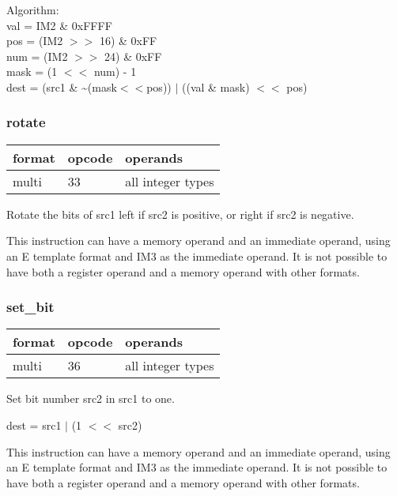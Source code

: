 \documentclass[forwardcom.tex]{subfiles}
\begin{document}
Algorithm:\\
val = IM2 \& 0xFFFF\\
pos = (IM2 $>>$ 16) \& 0xFF\\
num = (IM2 $>>$ 24) \& 0xFF\\
mask = (1 $<<$ num) - 1\\

dest = (src1 \& \~{}(mask$<<$pos)) $|$ ((val \& mask) $<<$ pos)
\vspace{2mm}


\subsubsection{rotate}
\label{table:rotateInstruction}
\begin{tabular}{|p{12mm}|p{12mm}|p{110mm}|}
\hline
\bfseries format & \bfseries opcode & \bfseries operands \\ \hline
multi & 33 & all integer types \\ \hline
\end{tabular}
\vspace{2mm}

Rotate the bits of src1 left if src2 is positive, or right if src2 is negative.

\vspace{2mm}
This instruction can have a memory operand and an immediate operand, using an E template format and IM3 as the immediate operand. It is not possible to have both a register operand and a memory operand with other formats.
\vspace{2mm}

\subsubsection{set\_bit}
\label{table:setBitInstruction}
\begin{tabular}{|p{12mm}|p{12mm}|p{110mm}|}
\hline
\bfseries format & \bfseries opcode & \bfseries operands \\ \hline
multi & 36 & all integer types \\ \hline
\end{tabular}
\vspace{2mm}

Set bit number src2 in src1 to one.
\vspace{2mm}

dest = src1 $|$ (1 $<<$ src2)

\vspace{2mm}
This instruction can have a memory operand and an immediate operand, using an E template format and IM3 as the immediate operand. It is not possible to have both a register operand and a memory operand with other formats.
\vspace{2mm}
\end{document}
